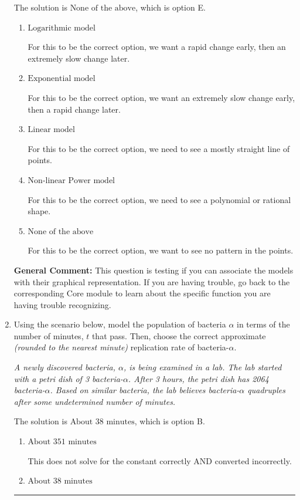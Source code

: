 \documentclass{extbook}[14pt]
\newcommand{\litem}[1]{\item #1

\rule{\textwidth}{0.4pt}}
\begin{document}
\begin{enumerate}
{The solution is \( \text{None of the above} \), which is option E.\begin{enumerate}[label=\Alph*.]
\item \( \text{Logarithmic model} \)

For this to be the correct option, we want a rapid change early, then an extremely slow change later.
\item \( \text{Exponential model} \)

For this to be the correct option, we want an extremely slow change early, then a rapid change later.
\item \( \text{Linear model} \)

For this to be the correct option, we need to see a mostly straight line of points.
\item \( \text{Non-linear Power model} \)

For this to be the correct option, we need to see a polynomial or rational shape.
\item \( \text{None of the above} \)

For this to be the correct option, we want to see no pattern in the points.
\end{enumerate}

\textbf{General Comment:} This question is testing if you can associate the models with their graphical representation. If you are having trouble, go back to the corresponding Core module to learn about the specific function you are having trouble recognizing.
}
\litem{
Using the scenario below, model the population of bacteria $\alpha$ in terms of the number of minutes, $t$ that pass. Then, choose the correct approximate \textit{(rounded to the nearest minute)} replication rate of bacteria-$\alpha$.

\begin{center}
    \textit{ A newly discovered bacteria, $\alpha$, is being examined in a lab. The lab started with a petri dish of 3 bacteria-$\alpha$. After 3 hours, the petri dish has 2064 bacteria-$\alpha$. Based on similar bacteria, the lab believes bacteria-$\alpha$ quadruples after some undetermined number of minutes. }
\end{center}
The solution is \( \text{About } 38 \text{ minutes} \), which is option B.\begin{enumerate}[label=\Alph*.]
\item \( \text{About } 351 \text{ minutes} \)

This does not solve for the constant correctly AND converted incorrectly.
\item \( \text{About } 38 \text{ minutes} \)


\end{enumerate}}
\end{enumerate}
\end{document}
